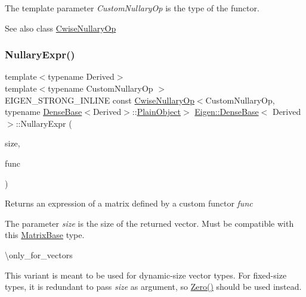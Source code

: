 The template parameter {\itshape Custom\+Nullary\+Op} is the type of the functor.

\begin{DoxySeeAlso}{See also}
class \mbox{\hyperlink{class_eigen_1_1_cwise_nullary_op}{Cwise\+Nullary\+Op}} 
\end{DoxySeeAlso}
\mbox{\label{class_eigen_1_1_dense_base_a3b9b80fd43c6c62a340d7497a144cf28}} 
\subsubsection{\texorpdfstring{NullaryExpr()}{NullaryExpr()}\hspace{0.1cm}{\footnotesize\ttfamily [2/3]}}
{\footnotesize\ttfamily template$<$typename Derived$>$ \\
template$<$typename Custom\+Nullary\+Op $>$ \\
E\+I\+G\+E\+N\+\_\+\+S\+T\+R\+O\+N\+G\+\_\+\+I\+N\+L\+I\+NE const \mbox{\hyperlink{class_eigen_1_1_cwise_nullary_op}{Cwise\+Nullary\+Op}}$<$Custom\+Nullary\+Op, typename \mbox{\hyperlink{class_eigen_1_1_dense_base}{Dense\+Base}}$<$Derived$>$\+::\mbox{\hyperlink{class_eigen_1_1_dense_base_aae45af9b5aca5a9caae98fd201f47cc4}{Plain\+Object}}$>$ \mbox{\hyperlink{class_eigen_1_1_dense_base}{Eigen\+::\+Dense\+Base}}$<$ Derived $>$\+::Nullary\+Expr (\begin{DoxyParamCaption}\item[{Index}]{size,  }\item[{const Custom\+Nullary\+Op \&}]{func }\end{DoxyParamCaption})}

\begin{DoxyReturn}{Returns}
an expression of a matrix defined by a custom functor {\itshape func} 
\end{DoxyReturn}
The parameter {\itshape size} is the size of the returned vector. Must be compatible with this \mbox{\hyperlink{class_eigen_1_1_matrix_base}{Matrix\+Base}} type.

\textbackslash{}only\+\_\+for\+\_\+vectors

This variant is meant to be used for dynamic-\/size vector types. For fixed-\/size types, it is redundant to pass {\itshape size} as argument, so \mbox{\hyperlink{class_eigen_1_1_dense_base_a8c4be762b10041d64a2b2ce85bb14ba0}{Zero()}} should be used instead.


